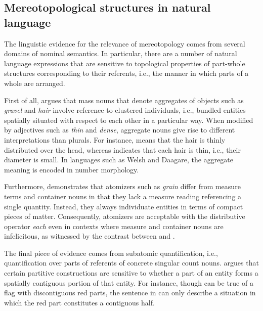 \documentclass[output=paper]{langscibook}
\begin{document}
\subsection{Mereotopological structures in natural language}\label{wan:sec:mereotopological-structures-in-natural-language}

The linguistic evidence for the relevance of mereotopology comes from several domains of nominal semantics. In particular, there are a number of natural language expressions that are sensitive to topological properties of part-whole structures corresponding to their referents, i.e., the manner in which parts of a whole are arranged. 

First of all, \citet{grimm2012number} argues that mass nouns that denote aggregates of objects such as \textit{gravel} and \textit{hair} involve reference to clustered individuals, i.e., bundled entities spatially situated with respect to each other in a particular way. When modified by adjectives such as \textit{thin} and \textit{dense}, aggregate nouns give rise to different interpretations than plurals. For instance,  means that the hair is thinly distributed over the head, whereas  indicates that each hair is thin, i.e., their diameter is small. In languages such as Welsh and Daagare, the aggregate meaning is encoded in number morphology.

\ea {}\label{wan:ex:hair}
\label{wan:ex:hairs}
\z
\z

\noindent Furthermore, \citet{scontras2014semantics} demonstrates that atomizers such as \textit{grain} differ from measure terms and container nouns in that they lack a measure reading referencing a single quantity. Instead, they always individuate entities in terms of compact pieces of matter. Consequently, atomizers are acceptable with the distributive operator \textit{each} even in contexts where measure and container nouns are infelicitous, as witnessed by the contrast between  and .

\ea {}\label{wan:ex:atomizer}
\label{wan:ex:measure-container}
\z
\z

\noindent The final piece of evidence comes from subatomic quantification, i.e., quantification over parts of referents of concrete singular count nouns. \citet{wagiel2018subatomic} argues that certain partitive constructions are sensitive to whether a part of an entity forms a spatially contiguous portion of that entity. For instance, though  can be true of a flag with discontiguous red parts, the sentence in  can only describe a situation in which the red part constitutes a contiguous half.
\end{document}
